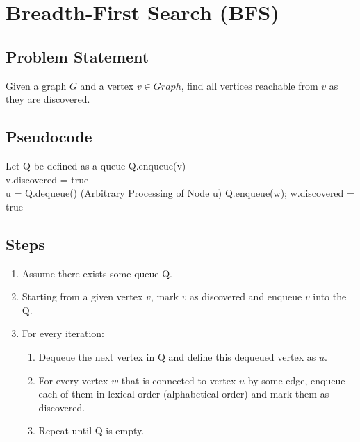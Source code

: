 \section{Breadth-First Search (BFS)}

\subsection*{Problem Statement}
Given a graph $G$ and a vertex $v \in Graph$, find all vertices reachable from $v$ as they are discovered.

\subsection*{Pseudocode}
\begin{algorithm}
	\begin{algorithmic}[1]
		\State Let Q be defined as a queue
		\State Q.enqueue(v)\\
		\State v.discovered = true\\
			\State u = Q.dequeue()
			\State (Arbitrary Processing of Node u)
					\State Q.enqueue(w);
					\State w.discovered = true
				\EndIf
			\EndFor
		\EndWhile
		\EndProcedure
	\end{algorithmic}
\end{algorithm}

\subsection*{Steps}
\begin{enumerate}
	\item Assume there exists some queue Q.
	\item Starting from a given vertex $v$, mark $v$ as discovered and enqueue $v$ into the Q.
	\item For every iteration:
	\begin{enumerate}
		\item Dequeue the next vertex in Q and define this dequeued vertex as $u$.
		\item For every vertex $w$ that is connected to vertex $u$ by some edge, enqueue each of them in lexical order (alphabetical order) and mark them as discovered.
		\item Repeat until Q is empty.
	\end{enumerate}
\end{enumerate}

